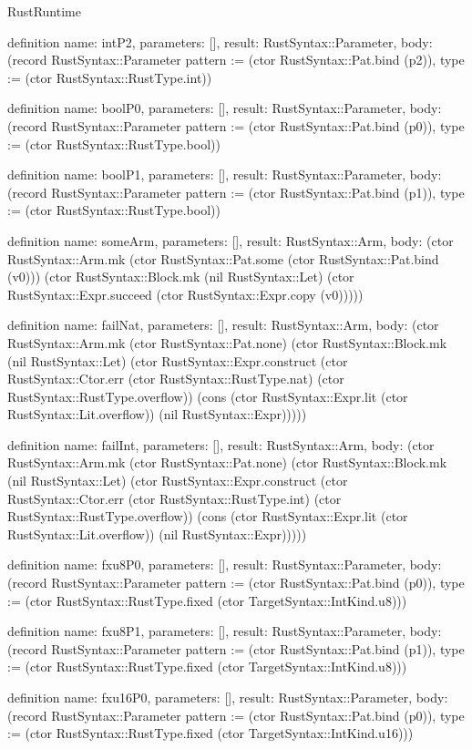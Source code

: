 \begin{lexlean}{RustRuntime}
\begin{semanticmodule}
definition{
  name: intP2,
  parameters: [],
  result: RustSyntax::Parameter,
  body: (record RustSyntax::Parameter {pattern := (ctor RustSyntax::Pat.bind (p2)), type := (ctor RustSyntax::RustType.int)})
}

definition{
  name: boolP0,
  parameters: [],
  result: RustSyntax::Parameter,
  body: (record RustSyntax::Parameter {pattern := (ctor RustSyntax::Pat.bind (p0)), type := (ctor RustSyntax::RustType.bool)})
}

definition{
  name: boolP1,
  parameters: [],
  result: RustSyntax::Parameter,
  body: (record RustSyntax::Parameter {pattern := (ctor RustSyntax::Pat.bind (p1)), type := (ctor RustSyntax::RustType.bool)})
}

definition{
  name: someArm,
  parameters: [],
  result: RustSyntax::Arm,
  body: (ctor RustSyntax::Arm.mk (ctor RustSyntax::Pat.some (ctor RustSyntax::Pat.bind (v0))) (ctor RustSyntax::Block.mk (nil RustSyntax::Let) (ctor RustSyntax::Expr.succeed (ctor RustSyntax::Expr.copy (v0)))))
}

definition{
  name: failNat,
  parameters: [],
  result: RustSyntax::Arm,
  body: (ctor RustSyntax::Arm.mk (ctor RustSyntax::Pat.none) (ctor RustSyntax::Block.mk (nil RustSyntax::Let) (ctor RustSyntax::Expr.construct (ctor RustSyntax::Ctor.err (ctor RustSyntax::RustType.nat) (ctor RustSyntax::RustType.overflow)) (cons (ctor RustSyntax::Expr.lit (ctor RustSyntax::Lit.overflow)) (nil RustSyntax::Expr)))))
}

definition{
  name: failInt,
  parameters: [],
  result: RustSyntax::Arm,
  body: (ctor RustSyntax::Arm.mk (ctor RustSyntax::Pat.none) (ctor RustSyntax::Block.mk (nil RustSyntax::Let) (ctor RustSyntax::Expr.construct (ctor RustSyntax::Ctor.err (ctor RustSyntax::RustType.int) (ctor RustSyntax::RustType.overflow)) (cons (ctor RustSyntax::Expr.lit (ctor RustSyntax::Lit.overflow)) (nil RustSyntax::Expr)))))
}

definition{
  name: fxu8P0,
  parameters: [],
  result: RustSyntax::Parameter,
  body: (record RustSyntax::Parameter {pattern := (ctor RustSyntax::Pat.bind (p0)), type := (ctor RustSyntax::RustType.fixed (ctor TargetSyntax::IntKind.u8))})
}

definition{
  name: fxu8P1,
  parameters: [],
  result: RustSyntax::Parameter,
  body: (record RustSyntax::Parameter {pattern := (ctor RustSyntax::Pat.bind (p1)), type := (ctor RustSyntax::RustType.fixed (ctor TargetSyntax::IntKind.u8))})
}

definition{
  name: fxu16P0,
  parameters: [],
  result: RustSyntax::Parameter,
  body: (record RustSyntax::Parameter {pattern := (ctor RustSyntax::Pat.bind (p0)), type := (ctor RustSyntax::RustType.fixed (ctor TargetSyntax::IntKind.u16))})
}


\end{semanticmodule}
\end{lexlean}
